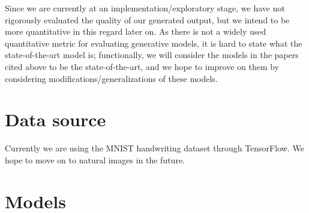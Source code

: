 \documentclass[11pt]{article}
\begin{document}
Since we are currently at an implementation/exploratory stage, we have not rigorously evaluated the quality of our generated output, but we intend to be more quantitative in this regard later on. As there is not a widely used quantitative metric for evaluating generative models, it is hard to state what the state-of-the-art model is; functionally, we will consider the models in the papers cited above to be the state-of-the-art, and we hope to improve on them by considering modifications/generalizations of these models.

\section*{Data source}

Currently we are using the MNIST handwriting dataset through TensorFlow. We hope to move on to natural images in the future.

\section*{Models}
\end{document}
